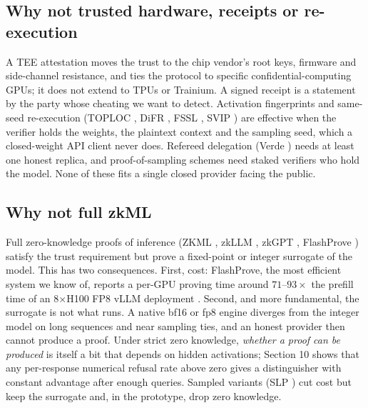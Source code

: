 \documentclass[10pt]{article}
\begin{document}
\subsection{Why not trusted hardware, receipts or re-execution}
A TEE attestation \cite{CSZS25} moves the trust to the chip vendor's root keys, firmware and side-channel resistance, and ties the protocol to specific confidential-computing GPUs; it does not extend to TPUs or Trainium. A signed receipt is a statement by the party whose cheating we want to detect. Activation fingerprints and same-seed re-execution (TOPLOC \cite{ODP+25}, DiFR \cite{KRR+25}, FSSL \cite{RKH+25}, SVIP \cite{SLZJZ24}) are effective when the verifier holds the weights, the plaintext context and the sampling seed, which a closed-weight API client never does. Refereed delegation (Verde \cite{AST+25}) needs at least one honest replica, and proof-of-sampling schemes \cite{ZWT+24,WZS+25} need staked verifiers who hold the model. None of these fits a single closed provider facing the public.

\subsection{Why not full zkML}
Full zero-knowledge proofs of inference (ZKML \cite{CWSK24}, zkLLM \cite{SLZ24}, zkGPT \cite{QSL+25}, FlashProve \cite{RAC+26}) satisfy the trust requirement but prove a fixed-point or integer surrogate of the model. This has two consequences. First, cost: FlashProve, the most efficient system we know of, reports a per-GPU proving time around $71\text{--}93\times$ the prefill time of an 8$\times$H100 FP8 vLLM deployment \cite{RAC+26}. Second, and more fundamental, the surrogate is not what runs. A native bf16 or fp8 engine diverges from the integer model on long sequences and near sampling ties, and an honest provider then cannot produce a proof. Under strict zero knowledge, \emph{whether a proof can be produced} is itself a bit that depends on hidden activations; Section 10 shows that any per-response numerical refusal rate above zero gives a distinguisher with constant advantage after enough queries. Sampled variants (SLP \cite{LY26}) cut cost but keep the surrogate and, in the prototype, drop zero knowledge.
\end{document}
